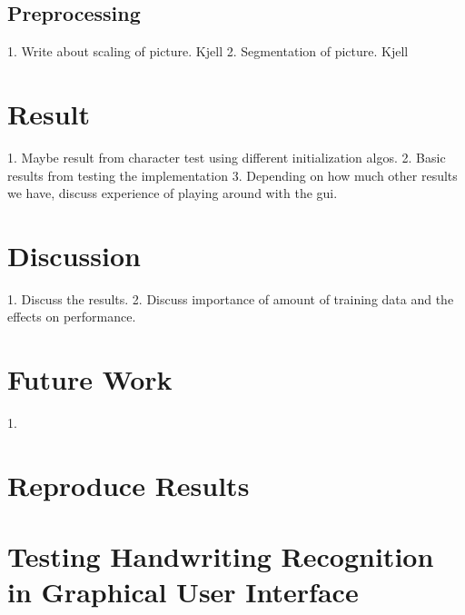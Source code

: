 \documentclass[11pt]{article}
\begin{document}
\subsection{Preprocessing}
1. Write about scaling of picture. Kjell
2. Segmentation of picture. Kjell

\section{Result}\label{sec:result}
1. Maybe result from character test using different initialization algos.
2. Basic results from testing the implementation
3. Depending on how much other results we have, discuss experience of playing around with the gui.



\section{Discussion}
1. Discuss the results.
2. Discuss importance of amount of training data and the effects on performance.

\section{Future Work}
1. 


\appendix

\section{Reproduce Results}

\section{Testing Handwriting Recognition in Graphical User Interface}
\end{document}
